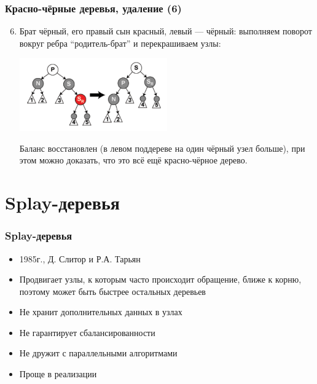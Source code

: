 \documentclass[xetex,mathserif,serif]{beamer}
\begin{document}
    \begin{frame}
        \frametitle{Красно-чёрные деревья, удаление (6)}
        \begin{enumerate}
            \setcounter{enumi}{5}
            \item Брат чёрный, его правый сын красный, левый --- чёрный: выполняем поворот вокруг ребра ``родитель-брат'' и перекрашиваем узлы:
            \begin{center}
                \includegraphics[width=0.5\textwidth]{deletion-from-red-black-tree5.png}
            \end{center}
            Баланс восстановлен (в левом поддереве на один чёрный узел больше), при этом можно доказать, что это всё ещё красно-чёрное дерево.
        \end{enumerate}
    \end{frame}

    \section{Splay-деревья}

    \begin{frame}
        \frametitle{Splay-деревья}
        \begin{itemize}
            \item 1985г., Д. Слитор и Р.А. Тарьян
            \item Продвигает узлы, к которым часто происходит обращение, ближе к корню, поэтому может быть быстрее остальных деревьев
            \item Не хранит дополнительных данных в узлах
            \item Не гарантирует сбалансированности
            \item Не дружит с параллельными алгоритмами
            \item Проще в реализации
        \end{itemize}
    \end{frame}
\end{document}
